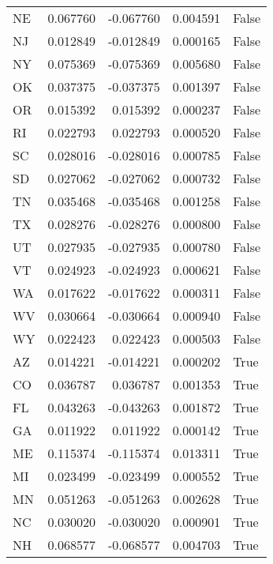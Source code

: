 \begin{table}
\begin{tabular}{lrrrl}
      NE &   0.067760 & -0.067760 &       0.004591 &         False \\
      NJ &   0.012849 & -0.012849 &       0.000165 &         False \\
      NY &   0.075369 & -0.075369 &       0.005680 &         False \\
      OK &   0.037375 & -0.037375 &       0.001397 &         False \\
      OR &   0.015392 &  0.015392 &       0.000237 &         False \\
      RI &   0.022793 &  0.022793 &       0.000520 &         False \\
      SC &   0.028016 & -0.028016 &       0.000785 &         False \\
      SD &   0.027062 & -0.027062 &       0.000732 &         False \\
      TN &   0.035468 & -0.035468 &       0.001258 &         False \\
      TX &   0.028276 & -0.028276 &       0.000800 &         False \\
      UT &   0.027935 & -0.027935 &       0.000780 &         False \\
      VT &   0.024923 & -0.024923 &       0.000621 &         False \\
      WA &   0.017622 & -0.017622 &       0.000311 &         False \\
      WV &   0.030664 & -0.030664 &       0.000940 &         False \\
      WY &   0.022423 &  0.022423 &       0.000503 &         False \\
      AZ &   0.014221 & -0.014221 &       0.000202 &          True \\
      CO &   0.036787 &  0.036787 &       0.001353 &          True \\
      FL &   0.043263 & -0.043263 &       0.001872 &          True \\
      GA &   0.011922 &  0.011922 &       0.000142 &          True \\
      ME &   0.115374 & -0.115374 &       0.013311 &          True \\
      MI &   0.023499 & -0.023499 &       0.000552 &          True \\
      MN &   0.051263 & -0.051263 &       0.002628 &          True \\
      NC &   0.030020 & -0.030020 &       0.000901 &          True \\
      NH &   0.068577 & -0.068577 &       0.004703 &          True \\

\end{tabular}
\end{table}
